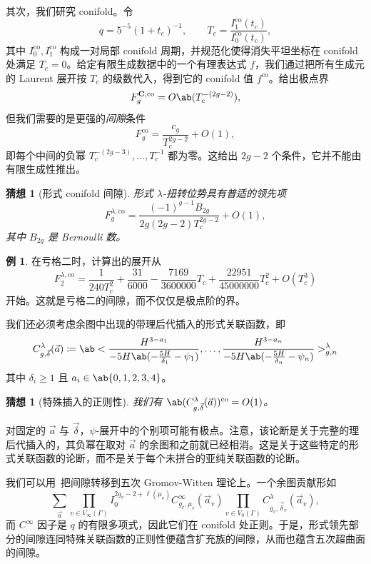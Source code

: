 \documentclass{amsart}
\newtheorem{conj}[thm]{猜想}
\theoremstyle{definition}
\newtheorem{exm}[thm]{例}
\theoremstyle{remark}
\theoremstyle{plain}
\theoremstyle{definition}
\theoremstyle{remark}
\newcommand{\mbf}[1]{\mathbf{#1}}
\newcommand{\mr}[1]{\mathrm{#1}}
\newcommand{\1}{\mathbf{1}}
\newcommand{\2}{\mathbf{2}}
\newcommand{\3}{\mathbf{3}}
\begin{document}
其次，我们研究 conifold。令
\[ q = 5^{-5}(1+t_c)^{-1}, \qquad T_c = \frac{I_1^{\mr{co}}(t_c)}{I_0^{\mr{co}}(t_c)}, \]
其中 \(I_0^{\mr{co}}, I_1^{\mr{co}}\) 构成一对局部 conifold 周期，并规范化使得消失平坦坐标在 conifold 处满足 \(T_c = 0\)。给定有限生成数据中的一个有理表达式 \(f\)，我们通过把所有生成元的 Laurent 展开按 \(T_c\) 的级数代入，得到它的 conifold 值 \(f^{\mr{co}}\)。给出极点界
\[ F_g^{\mbf{C},\mr{co}} = O\ab(T_c^{-(2g-2)}), \]
但我们需要的是更强的\textit{间隙}条件
\[ F_g^{\mr{co}} = \frac{c_g}{T_c^{2g-2}} + O(1), \]
即每个中间的负幂 \(T_c^{-(2g-3)}, \ldots, T_c^{-1}\) 都为零。这给出 \(2g-2\) 个条件，它并不能由有限生成性推出。

\begin{conj}[形式 conifold 间隙]%
\label{conj:formal conifold gap}
    形式 \(\lambda\)-扭转位势具有普适的领先项
    \[ F_g^{\lambda,\mr{co}} = \frac{(-1)^{g-1}B_{2g}}{2g(2g-2)T_c^{2g-2}} + O(1), \]
    其中 \(B_{2g}\) 是 Bernoulli 数。
\end{conj}

\begin{exm}
    在亏格二时，计算出的展开从
    \[ F_2^{\lambda,\mr{co}} = \frac{1}{240T_c^2} + \frac{31}{6000} - \frac{7169}{3600000}T_c + \frac{22951}{45000000}T_c^2 + O(T_c^3) \]
    开始。这就是亏格二的间隙，而不仅仅是极点阶的界。
\end{exm}

我们还必须考虑余图中出现的带理后代插入的形式关联函数，即
\[ C^{\lambda}_{g,\vec{\delta}}(\vec{a}) \coloneqq \ab< \frac{H^{3-a_1}}{-5H\ab(-\frac{5H}{\delta_1}-\psi_1)}, \ldots, \frac{H^{3-a_n}}{-5H\ab(-\frac{5H}{\delta_n}-\psi_n)}>^{\lambda}_{g,n} \]
其中 \(\delta_i \geq 1\) 且 \(a_i \in \ab\{0,1,2,3,4\}\)。

\begin{conj}[特殊插入的正则性]%
\label{conj:special correlator regularity}
    我们有 \(\ab(C^{\lambda}_{g,\vec{\delta}}(\vec{a}))^{\mr{co}} = O(1)\)。
\end{conj}

对固定的 \(\vec{a}\) 与 \(\vec{\delta}\)，\(\psi\)-展开中的个别项可能有极点。注意，该论断是关于完整的理后代插入的，其负幂在取对 \(\vec{a}\) 的余图和之前就已经相消。这是关于这些特定的形式关联函数的论断，而不是关于每个未拼合的亚纯关联函数的论断。

我们可以用~把间隙转移到五次 Gromov-Witten 理论上。一个余图贡献形如
\[ \sum_{\vec{a}} \prod_{v \in V_{\infty}(\Gamma)}I_0^{2g_v-2+\ell(\mu_v)}C^{\infty}_{g_v,\mu_v}(\vec{a}_v)\prod_{v\in V_0(\Gamma)}C^{\lambda}_{g_v,\vec{\delta}_v}(\vec{a}_v), \]
而 \(C^{\infty}\) 因子是 \(q\) 的有限多项式，因此它们在 conifold 处正则。于是，形式领先部分的间隙连同特殊关联函数的正则性便蕴含扩充族的间隙，从而也蕴含五次超曲面的间隙。
\end{document}
